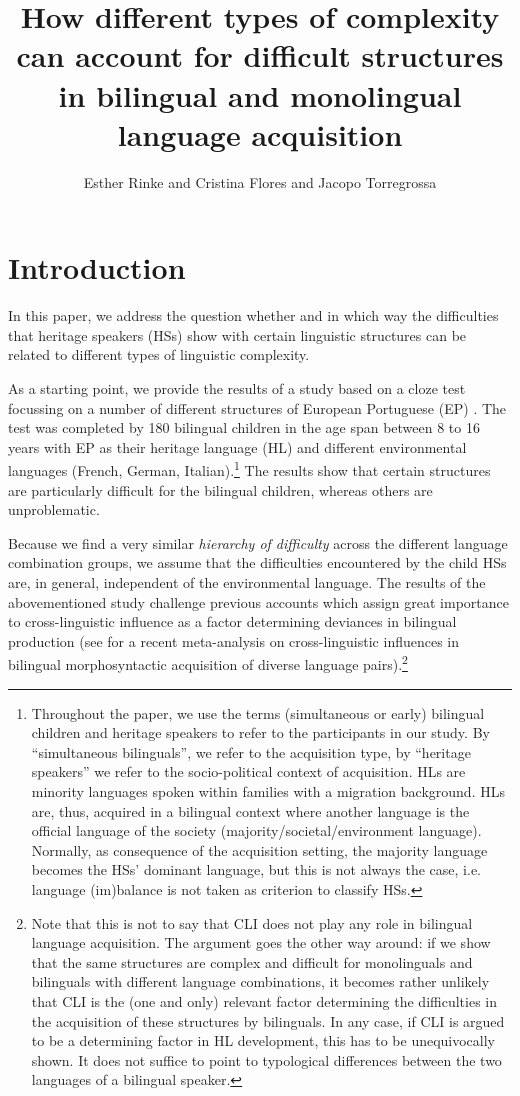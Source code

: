 \documentclass[output=paper]{langscibook}
\author{Esther Rinke\orcid{}\affiliation{Goethe University Frankfurt} and Cristina Flores\orcid{}\affiliation{Universidade do Minho} and Jacopo Torregrossa\orcid{}\affiliation{Goethe University Frankfurt}}
\title[How different types of complexity in language acquisition]
      {How different types of complexity can account for difficult structures in bilingual and monolingual language acquisition}
\begin{document}
\maketitle\pagebreak

\section{Introduction}\label{sec:rinke:1}

In this paper, we address the question whether and in which way the difficulties that heritage speakers (HSs) show with certain linguistic structures can be related to different types of linguistic complexity.

As a starting point, we provide the results of a study based on a cloze test focussing on a number of different structures of European Portuguese (EP) \citep{TorregrossaRinke2022}. The test was completed by 180 bilingual children in the age span between 8 to 16 years with EP as their heritage language (HL) and different environmental languages (French, German, Italian).\footnote{Throughout the paper, we use the terms (simultaneous or early) bilingual children and heritage speakers to refer to the participants in our study. By “simultaneous bilinguals”, we refer to the acquisition type, by “heritage speakers” we refer to the socio-political context of acquisition. HLs are minority languages spoken within families with a migration background. HLs are, thus, acquired in a bilingual context where another language is the official language of the society (majority\slash societal\slash environment language). Normally, as consequence of the acquisition setting, the majority language becomes the HSs' dominant language, but this is not always the case, i.e. language (im)balance is not taken as criterion to classify HSs.} The results show that certain structures are particularly difficult for the bilingual children, whereas others are unproblematic. 

Because we find a very similar \textit{hierarchy of difficulty} across the different language combination groups, we assume that the difficulties encountered by the child HSs are, in general, independent of the environmental language. The results of the abovementioned study challenge previous accounts which assign great importance to cross-linguistic influence as a factor determining deviances in bilingual production (see \citealt{VanDijk2021} for a recent meta-analysis on cross-linguistic influences in bilingual morphosyntactic acquisition of diverse language pairs).\footnote{ \textrm{Note that this is not to say that CLI does not play any role in bilingual language acquisition. The argument goes the other way around: if we show that the same structures are complex and difficult for monolinguals and bilinguals with different language combinations, it becomes rather unlikely that CLI is the (one and only) relevant factor determining the difficulties in the acquisition of these structures by bilinguals. In any case, if CLI is argued to be a determining factor in HL development, this has to be unequivocally shown. It does not suffice to point to typological differences between the two languages of a bilingual speaker.}} 
\end{document}
